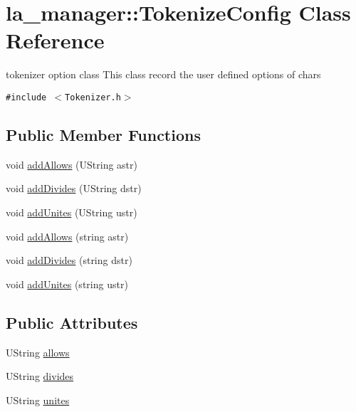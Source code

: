\hypertarget{classla__manager_1_1TokenizeConfig}{
\section{la\_\-manager::TokenizeConfig Class Reference}
\label{classla__manager_1_1TokenizeConfig}
}
tokenizer option class This class record the user defined options of chars  


{\tt \#include $<$Tokenizer.h$>$}

\subsection*{Public Member Functions}
\begin{CompactItemize}
\item 
void \hyperlink{classla__manager_1_1TokenizeConfig_e47f07d7aa30b9f966819a03624e9225}{addAllows} (UString astr)
\item 
void \hyperlink{classla__manager_1_1TokenizeConfig_9b5b2d544b9d1a685620029ba992b86c}{addDivides} (UString dstr)
\item 
void \hyperlink{classla__manager_1_1TokenizeConfig_7c8ee4325792c8ba91c2b3572794b5f1}{addUnites} (UString ustr)
\item 
void \hyperlink{classla__manager_1_1TokenizeConfig_6f272387b866ec7452108926b2f4d20e}{addAllows} (string astr)
\item 
void \hyperlink{classla__manager_1_1TokenizeConfig_ed3871dcad230dc85505a882bf71924e}{addDivides} (string dstr)
\item 
void \hyperlink{classla__manager_1_1TokenizeConfig_3a7d5eebb763ea06b1949361a9b38eaf}{addUnites} (string ustr)
\end{CompactItemize}
\subsection*{Public Attributes}
\begin{CompactItemize}
\item 
UString \hyperlink{classla__manager_1_1TokenizeConfig_a170be8e7618b3c6f451bb1e02738c09}{allows}
\item 
UString \hyperlink{classla__manager_1_1TokenizeConfig_20aa25a2db309aa7ca676e2808aee4f6}{divides}
\item 
UString \hyperlink{classla__manager_1_1TokenizeConfig_1422c8a46ddfd381f60ec3b302a47555}{unites}
\end{CompactItemize}


